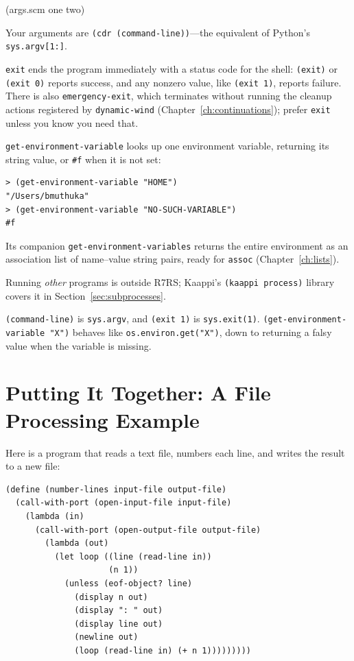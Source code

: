 \begin{codeoutput}
(args.scm one two)
\end{codeoutput}

Your arguments are \texttt{(cdr (command-line))}---the equivalent of Python's \texttt{sys.argv[1:]}.

\texttt{exit} ends the program immediately with a status code for the shell: \texttt{(exit)} or \texttt{(exit 0)} reports success, and any nonzero value, like \texttt{(exit 1)}, reports failure. There is also \texttt{emergency-exit}, which terminates without running the cleanup actions registered by \texttt{dynamic-wind} (Chapter~\ref{ch:continuations}); prefer \texttt{exit} unless you know you need that.

\texttt{get-environment-variable} looks up one environment variable, returning its string value, or \texttt{\#f} when it is not set:

\begin{lstlisting}[style=repl]
> (get-environment-variable "HOME")
"/Users/bmuthuka"
> (get-environment-variable "NO-SUCH-VARIABLE")
#f
\end{lstlisting}

Its companion \texttt{get-environment-variables} returns the entire environment as an association list of name--value string pairs, ready for \texttt{assoc} (Chapter~\ref{ch:lists}).

Running \emph{other} programs is outside R7RS; Kaappi's \texttt{(kaappi process)} library covers it in Section~\ref{sec:subprocesses}.

\begin{note}
\texttt{(command-line)} is \texttt{sys.argv}, and \texttt{(exit 1)} is \texttt{sys.exit(1)}. \texttt{(get-environment-variable "X")} behaves like \texttt{os.environ.get("X")}, down to returning a falsy value when the variable is missing.
\end{note}

\section{Putting It Together: A File Processing Example}

Here is a program that reads a text file, numbers each line, and writes the result to a new file:

\begin{lstlisting}
(define (number-lines input-file output-file)
  (call-with-port (open-input-file input-file)
    (lambda (in)
      (call-with-port (open-output-file output-file)
        (lambda (out)
          (let loop ((line (read-line in))
                     (n 1))
            (unless (eof-object? line)
              (display n out)
              (display ": " out)
              (display line out)
              (newline out)
              (loop (read-line in) (+ n 1)))))))))
\end{lstlisting}


